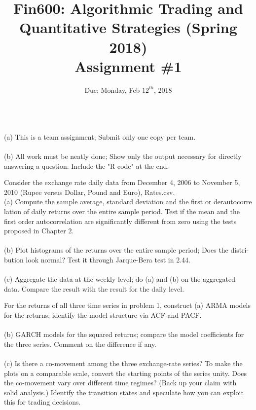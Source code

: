\documentclass{article}
\title{Fin600: Algorithmic Trading and Quantitative Strategies (Spring 2018)\\
Assignment \#1}
\date{Due: Monday, Feb $12^{th}$, 2018}
\begin{document}
\maketitle

~\\
(a) This is a team assignment; Submit only one copy per team.\\
~\\
(b) All work must be neatly done; Show only the output necessary for directly answering a question. Include the "R-code" at the end.


\newpage

\begin{enumerate}
    \item {Consider the exchange rate daily data from December 4, 2006 to November 5,
2010 (Rupee versus Dollar, Pound and Euro), Rates.csv.\\
(a) Compute the sample average, standard deviation and the first or derautocorre lation of daily returns over the entire sample period. Test if the mean and the first order autocorrelation are significantly different from zero using the tests proposed in Chapter 2.\\
~\\
(b) Plot histograms of the returns over the entire sample period; Does the distri- bution look normal? Test it through Jarque-Bera test in 2.44.\\
~\\
(c) Aggregate the data at the weekly level; do (a) and (b) on the aggregated data. Compare the result with the result for the daily level.

\item{For the returns of all three time series in problem 1, construct}
(a) ARMA models for the returns; identify the model structure via ACF and PACF.\\
~\\
(b) GARCH models for the squared returns; compare the model coefficients for the three series. Comment on the difference if any.\\
~\\
(c) Is there a co-movement among the three exchange-rate series? To make the plots on a comparable scale, convert the starting points of the series unity. Does the co-movement vary over different time regimes? (Back up your claim with solid analysis.) Identify the transition states and speculate how you can exploit this for trading decisions.}


\end{enumerate}
\end{document}
